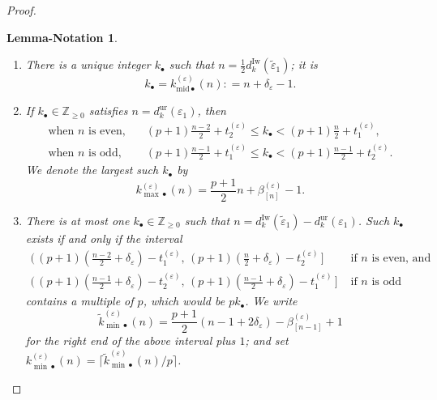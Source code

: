 \documentclass[12pt]{amsart}
\newtheorem{lemmanotation}[subsection]{Lemma-Notation}
\theoremstyle{definition}
\numberwithin{equation}{subsection}
\def\ZZ{\mathbb{Z}}
\newcommand{\Iw}{\mathrm{Iw}}
\newcommand{\unr}{\mathrm{ur}}
\newcommand{\midd}{\mathrm{mid}}
\begin{document}
\begin{proof}
\begin{lemmanotation}
\begin{enumerate}
\item There is a unique integer $k_\bullet$ such that  $n=\frac 12 d_{k}^\Iw(\tilde \varepsilon_1)$; it is
$$k_\bullet = k_{\midd\bullet}^{(\varepsilon)}(n): = n+\delta_\varepsilon-1.$$

\item If $k_\bullet \in \ZZ_{\geq 0}$ satisfies $n = d_{k}^\unr(\varepsilon_1)$, then
\begin{align*}
\textrm{when } n \textrm{ is even,}&\quad (p+1)\tfrac {n-2}2 + t_2^{(\varepsilon)} \leq  k_\bullet  < (p+1)\tfrac {n}2 + t_1^{(\varepsilon)},
\\
\textrm{when } n \textrm{ is odd,}&\quad (p+1)\tfrac {n-1}2 + t_1^{(\varepsilon)} \leq k_\bullet < (p+1)\tfrac {n-1}2 + t_2^{(\varepsilon)}.
\end{align*}
We denote the largest such $k_\bullet$ by  $$k_{{\max}\bullet}^{(\varepsilon)}(n)=\frac{p+1}2 n + \beta_{[n]}^{(\varepsilon)}-1.$$

\item 
There is at most one $k_\bullet \in \ZZ_{\geq 0}$ such that  $n = d_{k}^\Iw(\tilde \varepsilon_1)-d_{k}^\unr(\varepsilon_1)$.
Such $k_\bullet$ exists if and only if the interval
\begin{align}
\label{E:condition on kmin}
\big(\,(p+1)( \tfrac {n-2}2 + \delta_\varepsilon)  -t_1^{(\varepsilon)} , \, (p+1)( \tfrac n2 + \delta_\varepsilon)  -t_2^{(\varepsilon)}\, \big]& \textrm{ if }n \textrm{ is even, and}
\\
\nonumber \big(\,(p+1)( \tfrac {n-1}2 + \delta_\varepsilon)  -t_2^{(\varepsilon)} , \, (p+1)( \tfrac {n-1}2 + \delta_\varepsilon)  -t_1^{(\varepsilon)}\, \big] &\textrm{ if }n \textrm{ is odd}
\end{align}
contains a multiple of $p$, which would be $pk_\bullet$. We write $$\tilde k_{{\min}\bullet}^{(\varepsilon)}(n)= \frac{p+1}2(n-1+2\delta_\varepsilon) - \beta_{[n-1]}^{(\varepsilon)}+1$$ for the \emph{right end} of the above interval plus $1$; and set $k_{{\min}\bullet}^{(\varepsilon)}(n) = \lceil \tilde k_{{\min}\bullet}^{(\varepsilon)} (n)/ p\rceil$.



\end{enumerate}
\end{lemmanotation}
\end{proof}
\end{document}
